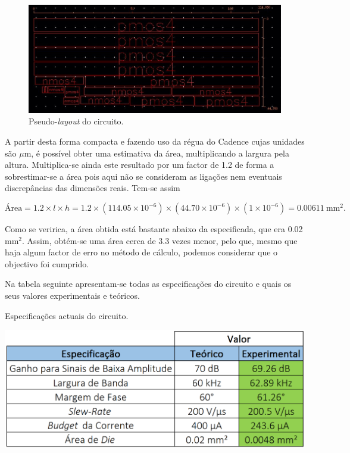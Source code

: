 \documentclass[11pt]{article}
\numberwithin{equation}{section}
\begin{document}
\begin{figure}[H]
	\centering
	\includegraphics[keepaspectratio=true, scale=0.45]{exps/area}
	\vspace{-0.5em}
	\caption{Pseudo-\textit{layout} do circuito.}
	\vspace{-0.8em}
\end{figure}

A partir desta forma compacta e fazendo uso da régua do Cadence cujas unidades são $\mu$m, é possível obter uma estimativa da área, multiplicando a largura pela altura. Multiplica-se ainda este resultado por um factor de 1.2 de forma a sobrestimar-se a área pois aqui não se consideram as ligações nem eventuais discrepâncias das dimensões reais. Tem-se assim

\vspace{-7mm}
\begin{equation}
\text{Área} = 1.2\times l\times h = 1.2\times\left(114.05 \times 10^{-6}\right) \times \left(44.70 \times 10^{-6}\right) \times \left(1 \times 10^{-6}\right) = 0.00611~\text{mm}^2.
\end{equation}

\vspace{-1mm}
Como se veririca, a área obtida está bastante abaixo da especificada, que era 0.02 $\text{mm}^2$. Assim, obtém-se uma área cerca de 3.3 vezes menor, pelo que, mesmo que haja algum factor de erro no método de cálculo, podemos considerar que o objectivo foi cumprido. 

Na tabela seguinte apresentam-se todas as especificações do circuito e quais os seus valores experimentais e teóricos.

\begin{table}[H]
	\centering
	\caption{Especificações actuais do circuito.}
	\vspace{-1.5mm}
	\includegraphics[keepaspectratio=true, scale=0.40]{teoricas/tabcarea}
\end{table}
\end{document}
